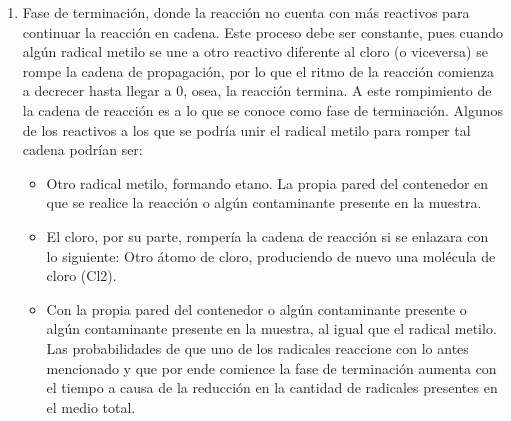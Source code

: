 \begin{enumerate}
    \item Fase de terminación, donde la reacción no cuenta con más reactivos para continuar la reacción en cadena. Este proceso debe ser constante, pues cuando algún radical metilo se une a otro reactivo diferente al cloro (o viceversa) se rompe la cadena de propagación, por lo que el ritmo de la reacción comienza a decrecer hasta llegar a 0, osea, la reacción termina. A este rompimiento de la cadena de reacción es a lo que se conoce como fase de terminación. Algunos de los reactivos a los que se podría unir el radical metilo para romper tal cadena podrían ser:
        \begin{itemize}
            \item Otro radical metilo, formando etano. La propia pared del contenedor en que se realice la reacción o algún contaminante presente en la muestra.
            \item El cloro, por su parte, rompería la cadena de reacción si se enlazara con lo siguiente: Otro átomo de cloro, produciendo de nuevo una molécula de cloro (Cl2).
            \item Con la propia pared del contenedor o algún contaminante presente o algún contaminante presente en la muestra, al igual que el radical metilo. Las probabilidades de que uno de los radicales reaccione con lo antes mencionado y que por ende comience la fase de terminación aumenta con el tiempo a causa de la reducción en la cantidad de radicales presentes en el medio total.
        \end{itemize}
\end{enumerate}
